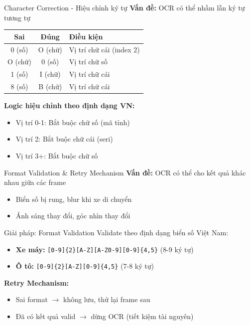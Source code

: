 \begin{frame}{Character Correction - Hiệu chỉnh ký tự}
    \textbf{Vấn đề:} OCR có thể nhầm lẫn ký tự tương tự

    \begin{table}
        \centering
        \small
        \begin{tabular}{|c|c|l|}
            \hline
            \textbf{Sai} & \textbf{Đúng} & \textbf{Điều kiện} \\
            \hline
            0 (số) & O (chữ) & Vị trí chữ cái (index 2) \\
            \hline
            O (chữ) & 0 (số) & Vị trí chữ số \\
            \hline
            1 (số) & I (chữ) & Vị trí chữ cái \\
            \hline
            8 (số) & B (chữ) & Vị trí chữ cái \\
            \hline
        \end{tabular}
    \end{table}

    \textbf{Logic hiệu chỉnh theo định dạng VN:}
    \begin{itemize}
        \item Vị trí 0-1: Bắt buộc chữ số (mã tỉnh)
        \item Vị trí 2: Bắt buộc chữ cái (seri)
        \item Vị trí 3+: Bắt buộc chữ số
    \end{itemize}
\end{frame}

\begin{frame}{Format Validation \& Retry Mechanism}
    \textbf{Vấn đề:} OCR có thể cho kết quả khác nhau giữa các frame
    \begin{itemize}
        \item Biển số bị rung, blur khi xe di chuyển
        \item Ánh sáng thay đổi, góc nhìn thay đổi
    \end{itemize}

    \begin{block}{Giải pháp: Format Validation}
    Validate theo định dạng biển số Việt Nam:
    \begin{itemize}
        \item \textbf{Xe máy:} \texttt{[0-9]\{2\}[A-Z][A-Z0-9][0-9]\{4,5\}} (8-9 ký tự)
        \item \textbf{Ô tô:} \texttt{[0-9]\{2\}[A-Z][0-9]\{4,5\}} (7-8 ký tự)
    \end{itemize}
    \end{block}

    \textbf{Retry Mechanism:}
    \begin{itemize}
        \item Sai format $\rightarrow$ không lưu, thử lại frame sau
        \item Đã có kết quả valid $\rightarrow$ dừng OCR (tiết kiệm tài nguyên)
    \end{itemize}
\end{frame}

